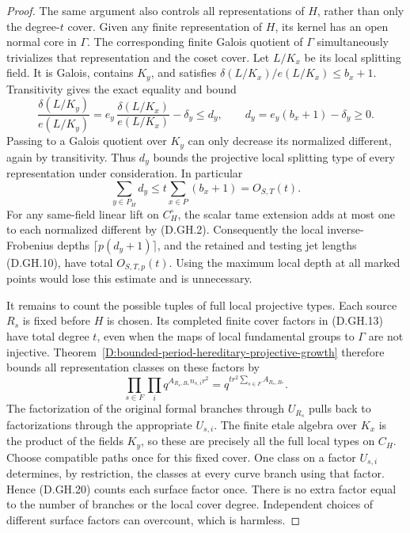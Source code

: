 \begin{proof}
The same argument also controls all representations
of \(H\), rather than only the degree-\(t\) cover.
Given any finite representation of \(H\), its kernel
has an open normal core in \(\Gamma\).
The corresponding finite Galois quotient of
\(\Gamma\) simultaneously trivializes that
representation and the coset cover.
Let \(L/K_x\) be its local splitting field.
It is Galois, contains \(K_y\), and satisfies
\(\delta(L/K_x)/e(L/K_x)\le b_x+1\).
Transitivity gives the exact equality and bound
\[
 \frac{\delta(L/K_y)}{e(L/K_y)}
 =e_y\,\frac{\delta(L/K_x)}{e(L/K_x)}-\delta_y
 \le d_y,\qquad
                  d_y=e_y(b_x+1)-\delta_y\ge0.          \tag{D.GH.18}
\]
Passing to a Galois quotient over \(K_y\) can only
decrease its normalized different, again by
transitivity. Thus \(d_y\) bounds the projective
local splitting type of every representation
under consideration.
In particular
\[
                 \sum_{y\in P_H}d_y
                      \le t\sum_{x\in P}(b_x+1)
                      =O_{S,T}(t).                    \tag{D.GH.19}
\]
For any same-field linear lift on \(C_H^\circ\),
the scalar tame extension adds at most one to
each normalized different by (D.GH.2).
Consequently the local inverse-Frobenius depths
\(\lceil p(d_y+1)\rceil\), and the retained and
testing jet lengths (D.GH.10), have total \(O_{S,T,p}(t)\).
Using the maximum local depth at all marked points
would lose this estimate and is unnecessary.

It remains to count the possible tuples of full local
projective types. Each source \(R_s\) is fixed before
\(H\) is chosen. Its completed finite cover factors
in (D.GH.13) have total degree \(t\), even when
the maps of local fundamental groups to \(\Gamma\)
are not injective.
Theorem~\ref{D:bounded-period-hereditary-projective-growth}
therefore bounds all representation classes on
these factors by
\[
 \prod_{s\in F}\prod_i q^{A_{R_s,B_*}n_{s,i}r^2}
                  =q^{t r^2\sum_{s\in F}A_{R_s,B_*}}.
                                                        \tag{D.GH.20}
\]
The factorization of the original formal branches
through \(U_{R_s}\) pulls back to factorizations
through the appropriate \(U_{s,i}\).
The finite etale algebra over \(K_x\) is the product
of the fields \(K_y\), so these are precisely all
the full local types on \(C_H\).
Choose compatible paths once for this fixed cover.
One class on a factor \(U_{s,i}\) determines, by
restriction, the classes at every curve branch
using that factor. Hence (D.GH.20) counts each
surface factor once. There is no extra factor
equal to the number of branches or the local
cover degree. Independent choices of different
surface factors can overcount, which is harmless.


\end{proof}
